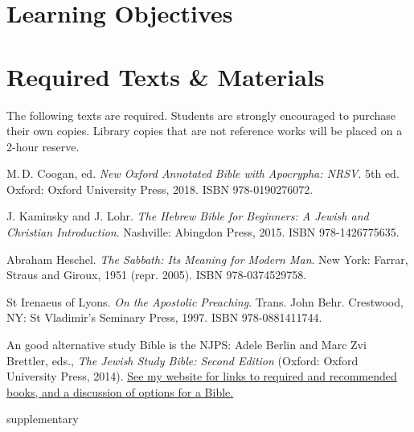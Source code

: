 \documentclass[titlepage]{article}
\newcommand\incl{../includes}
\begin{document}


  \section{Learning Objectives}
  \label{objectives}

  \edobject

\section{Required Texts \& Materials}
\label{texts}

The following texts are required. Students are strongly encouraged to
purchase their own copies. Library copies that are not reference works
will be placed on a 2-hour reserve.

\begingroup
\renewcommand{\section}[2]{}%
\begin{thebibliography}{Irenaeus}%

	 M.\,D. Coogan, ed.
    \emph{New Oxford Annotated Bible with Apocrypha: NRSV}. 5th ed.
    Oxford: Oxford University Press, 2018.
    ISBN 978-0190276072.

	 J. Kaminsky and J. Lohr.
	\emph{The Hebrew Bible for Beginners: A Jewish and Christian Introduction}.
	Nashville: Abingdon Press, 2015.
	ISBN 978-1426775635.

	 Abraham Heschel.
	\emph{The Sabbath: Its Meaning for Modern Man}.
	New York: Farrar, Straus and Giroux, 1951 (repr. 2005).
	ISBN 978-0374529758.

	 St Irenaeus of Lyons.
	\emph{On the Apostolic Preaching}.
	Trans. John Behr.
	Crestwood, NY: St Vladimir’s Seminary Press, 1997.
	ISBN 978-0881411744.

\end{thebibliography}
\endgroup

An good alternative study Bible is the NJPS: Adele Berlin and Marc Zvi
Brettler, eds., \emph{The Jewish Study Bible: Second Edition} (Oxford:
Oxford University Press, 2014). \href{https://danieldriver.com/courses/bf-1001/}{See
my website for links to required and recommended books, and a discussion
of options for a Bible.}

\section{Supplementary Texts}
\label{supplementary}
\end{document}
